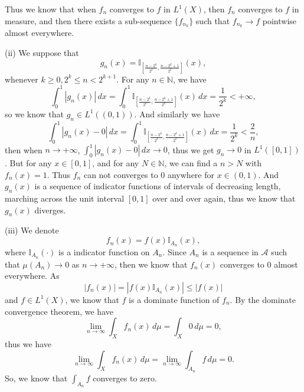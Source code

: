 \documentclass[12pt]{article}
\begin{document}
Thus we know that when $f_{n}$ converges to $f$ in $L^{1}(X)$, then $f_{n}$ converges to $f$ in measure, and then there exists a sub-sequence $\{f_{n_{k}}\}$ such that $f_{n_{k}} \to f$ pointwise almost everywhere.

\vspace{8pt}

(ii) We suppose that
\begin{equation*}
    g_{n} (x) = \mathbb{I}_{[\frac{n - 2^{k}}{2^{k}}, \frac{n - 2^{k} + 1}{2^{k}}]} (x),
\end{equation*}
whenever $k \geq 0, 2^{k} \leq n < 2^{k + 1}$. For any $n \in \mathbb{N}$, we have
\begin{equation*}
    \int_{0}^{1} | g_{n} (x) | \, d x = \int_{0}^{1} \mathbb{I}_{[\frac{n - 2^{k}}{2^{k}}, \frac{n - 2^{k} + 1}{2^{k}}]} (x) \, d x  = \frac{1}{2^{k}} < +\infty,
\end{equation*}
so we know that $g_{n} \in L^{1}((0, 1))$. And similarly we have
\begin{equation*}
    \int_{0}^{1} | g_{n} (x) - 0 | \, d x = \int_{0}^{1} \mathbb{I}_{[\frac{n - 2^{k}}{2^{k}}, \frac{n - 2^{k} + 1}{2^{k}}]} (x) \, d x  = \frac{1}{2^{k}} < \frac{2}{n},
\end{equation*}
then when $n \to + \infty$, $\int_{0}^{1} | g_{n} (x) - 0 | \, d x \to 0$, thus we get $g_{n} \to 0$ in $L^{1}([0, 1])$. But for any $x \in [0, 1]$, and for any $N \in \mathbb{N}$, we can find a $n > N$ with $f_{n} (x) = 1$. Thus $f_{n}$ can not converges to $0$ anywhere for $x \in (0, 1)$. And $g_{n}(x)$ is a sequence of indicator functions of intervals of decreasing length, marching across the unit interval $[0,1]$ over and over again, thus we know that $g_{n}(x)$ diverges.

\vspace{8pt}

(iii) We denote
\begin{equation*}
   f_{n}(x) = f(x) \mathbb{I}_{A_{n}} (x),
\end{equation*}
where $\mathbb{I}_{A_{n}} (\cdot)$ is a indicator function on $A_{n}$. Since $A_{n}$ is a sequence in $\mathcal{A}$ such that $\mu(A_{n}) \to 0$ as $n \to + \infty$, then we know that $f_{n}(x)$ converges to $0$ almost everywhere. As
\begin{equation*}
   |f_{n}(x)| = |f(x) \mathbb{I}_{A_{n}} (x)| \leq |f(x)|
\end{equation*}
and $f \in L^{1}(X)$, we know that $f$ is a dominate function of $f_{n}$. By the dominate convergence theorem, we have
\begin{equation*}
   \lim_{n \to \infty} \int_{X}^{} f_{n}(x) \, d \mu = \int_{X}^{} 0 \, d \mu = 0,
\end{equation*}
thus we have
\begin{equation*}
   \lim_{n \to \infty} \int_{X}^{} f_{n}(x) \, d \mu = \lim_{n \to \infty} \int_{A_{n}}^{} f \, d \mu = 0.
\end{equation*}
So, we know that $\int_{A_{n}}^{} f$ converges to zero.
\end{document}
